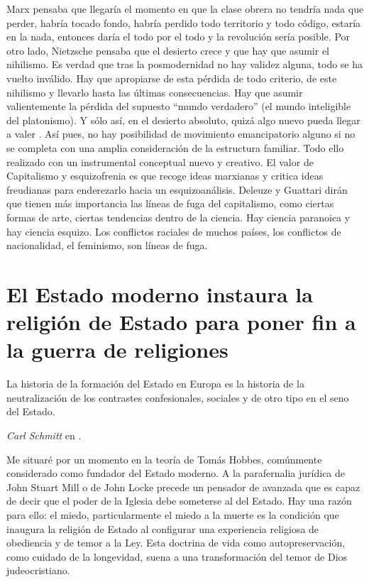 Marx pensaba que llegaría el momento en que la clase obrera no tendría nada que perder, habría tocado fondo, habría perdido todo territorio y todo código, estaría en la nada, entonces daría el todo por el todo y la revolución sería posible. Por otro lado, Nietzsche pensaba que el desierto crece y que hay que asumir el nihilismo. Es verdad que tras la posmodernidad no hay validez alguna, todo se ha vuelto inválido. Hay que apropiarse de esta pérdida de todo criterio, de este nihilismo y llevarlo hasta las últimas consecuencias. Hay que asumir valientemente la pérdida del supuesto \enquote{mundo verdadero} (el mundo inteligible del platonismo). Y sólo así, en el desierto absoluto, quizá algo nuevo pueda llegar a valer \autocite{GILLESDELEUZEMAQUINA}. Así pues, no hay posibilidad de movimiento emancipatorio alguno si no se completa con una amplia consideración de la estructura familiar. Todo ello realizado con un instrumental conceptual nuevo y creativo. El valor de Capitalismo y esquizofrenia es que recoge ideas marxianas y critica ideas freudianas para enderezarlo hacia un esquizoanálisis. Deleuze y Guattari dirán que tienen más importancia las líneas de fuga del capitalismo, como ciertas formas de arte, ciertas tendencias dentro de la ciencia. Hay ciencia paranoica y hay ciencia esquizo. Los conflictos raciales de muchos países, los conflictos de nacionalidad, el feminismo, son líneas de fuga.

\section{El Estado moderno instaura la religión de Estado para poner fin a la guerra de religiones}
\label{sec:el-estado-moderno-instaura}

\epigraph{La historia de la formación del Estado en Europa es la historia de la neutralización de los contrastes confesionales, sociales y de otro tipo en el seno del Estado.}{\emph{Carl Schmitt} en
\autocite{tiqqunIntroduccionGuerraCivil2008}.}

Me situaré por un momento en la teoría de Tomás Hobbes, comúnmente considerado como fundador del Estado moderno. A la parafernalia jurídica de John Stuart Mill o de John Locke precede un pensador de avanzada que es capaz de decir que el poder de la Iglesia debe someterse al del Estado. Hay una razón para ello: el miedo, particularmente el miedo a la muerte es la condición que inaugura la religión de Estado al configurar una experiencia religiosa de obediencia y de temor a la Ley. Esta doctrina de vida como autopreservación, como cuidado de la longevidad, suena a una transformación del temor de Dios judeocristiano.

